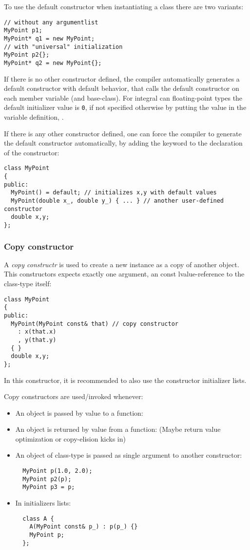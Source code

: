 To use the default constructor when instantiating a class there are two variants:
%
\begin{verbatim}
// without any argumentlist
MyPoint p1;
MyPoint* q1 = new MyPoint;
// with "universal" initialization
MyPoint p2{};
MyPoint* q2 = new MyPoint{};
\end{verbatim}

If there is no other constructor defined, the compiler automatically generates a default constructor with default behavior, \ie that calls the default constructor
on each member variable (and base-class). For integral can floating-point types the default initializer value is \texttt{0}, if not specified otherwise by
putting the value in the variable definition, \ie {}.

If there is any other constructor defined, one can force the compiler to generate the default constructor automatically, by adding the keyword  to
the declaration of the constructor:
%
\begin{verbatim}
class MyPoint
{
public:
  MyPoint() = default; // initializes x,y with default values
  MyPoint(double x_, double y_) { ... } // another user-defined constructor
  double x,y;
};
\end{verbatim}


\subsubsection{Copy constructor}
A \emph{copy constructr} is used to create a new instance as a copy of another object. This constructors expects exactly one argument, an const lvalue-reference
to the class-type itself:
%
\begin{verbatim}
class MyPoint
{
public:
  MyPoint(MyPoint const& that) // copy constructor
    : x(that.x)
    , y(that.y)
  { }
  double x,y;
};
\end{verbatim}
%
In this constructor, it is recommended to also use the constructor initializer lists.

Copy constructors are used/invoked whenever:
\begin{itemize}
  \item An object is passed by value to a function:
  \item An object is returned by value from a function:
    (Maybe return value optimization or copy-elision kicks in)
  \item An object of class-type is passed as single argument to another constructor:
    \begin{verbatim}
  MyPoint p(1.0, 2.0);
  MyPoint p2(p);
  MyPoint p3 = p;
    \end{verbatim}
  \item In initializers lists:
    \begin{verbatim}
  class A {
    A(MyPoint const& p_) : p(p_) {}
    MyPoint p;
  };
    \end{verbatim}
\end{itemize}

